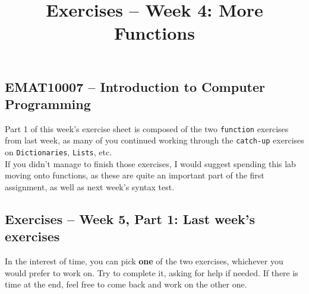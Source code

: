 \documentclass[11pt]{report}
\begin{document}
\title{Exercises -- Week 4: More Functions}
\subsection*{EMAT10007 -- Introduction to Computer Programming}

Part 1 of this week's exercise sheet is composed of the two {\tt function} exercises from last week, as many of you continued working through the {\tt catch-up} exercises on {\tt Dictionaries}, {\tt Lists}, etc.\\

\noindent If you didn't manage to finish those exercises, I would suggest spending this lab moving onto functions, as these are quite an important part of the first assignment, as well as next week's syntax test.

\subsection*{Exercises -- Week 5, Part 1: Last week's exercises}

In the interest of time, you can pick \textbf{one} of the two exercises, whichever you would prefer to work on. Try to complete it, asking for help if needed. If there is time at the end, feel free to come back and work on the other one.
\end{document}
